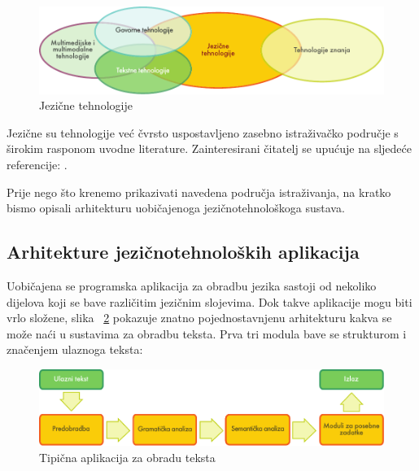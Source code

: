 \begin{multicols}{2}
\begin{figure}[htb]
  \center
  \includegraphics[width=\textwidth]{../_media/croatian/language_technologies}
  \caption{Jezične tehnologije}
  \label{fig:ltincontext_cro}
\end{figure}

Jezične su tehnologije već čvrsto uspostavljeno zasebno istraživačko područje s širokim rasponom uvodne literature. Zainteresirani čitatelj se upućuje na sljedeće referencije: \cite{pro12, boo7, boo8, str37, boo9}.

Prije nego što krenemo prikazivati navedena područja istraživanja, na kratko bismo opisali arhitekturu uobičajenoga jezičnotehnološkoga sustava.

\subsection{Arhitekture jezičnotehnoloških aplikacija}

Uobičajena se programska aplikacija za obradbu jezika sastoji od nekoliko dijelova koji se bave različitim jezičnim slojevima. Dok takve aplikacije mogu biti vrlo složene, slika ~\ref{fig:textprocessingarch_cro} pokazuje znatno pojednostavnjenu arhitekturu kakva se može naći u sustavima za obradbu teksta. Prva tri modula bave se strukturom i značenjem ulaznoga teksta:

\begin{figure}[b]
  \center
  \includegraphics[width=\textwidth]{../_media/croatian/text_processing_app_architecture}
  \caption{Tipična aplikacija za obradu teksta}
  \label{fig:textprocessingarch_cro}
\end{figure}


\end{multicols}
